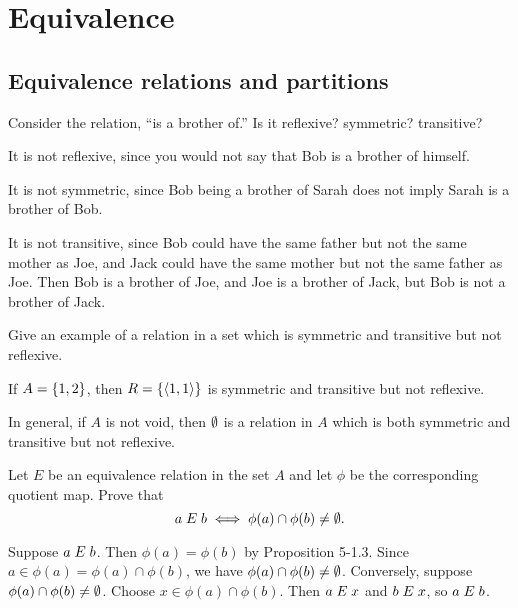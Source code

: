 \chapter{Equivalence}
\section{Equivalence relations and partitions}

\begin{exercise}
    Consider the relation, ``is a brother of.'' Is it reflexive? symmetric? transitive?
\end{exercise}

\begin{solution}
It is not reflexive, since you would not say that Bob is a brother of himself.

It is not symmetric, since Bob being a brother of Sarah does not imply Sarah is a brother of Bob.

It is not transitive, since Bob could have the same father but not the same mother as Joe,
and Jack could have the same mother but not the same father as Joe. Then Bob is a brother of Joe,
and Joe is a brother of Jack, but Bob is not a brother of Jack.
\end{solution}

\begin{exercise}
Give an example of a relation in a set which is symmetric and transitive but not
reflexive.
\end{exercise}

\begin{solution}
If $A=\left\{1,2\right\}$, then $R=\left\{\left\langle1,1\right\rangle\right\}$ is symmetric and transitive but not reflexive.

In general, if $A$ is not void, then $\emptyset$ is a relation in $A$ which is both
symmetric and transitive but not reflexive.
\end{solution}

\begin{exercise}
Let $E$ be an equivalence relation in the set $A$ and let $\phi$ be the corresponding quotient
map. Prove that
\[a\mathrel{E} b\iff \phi(a)\cap\phi(b)\neq\emptyset.\]
\end{exercise}

\begin{solution}
Suppose $a\mathrel{E} b$. Then $\phi(a)=\phi(b)$ by Proposition 5-1.3. Since $a\in\phi(a)=\phi(a)\cap\phi(b)$,
we have $\phi(a)\cap\phi(b)\neq\emptyset$.
Conversely, suppose $\phi(a)\cap\phi(b)\neq\emptyset$. Choose $x\in \phi(a)\cap\phi(b)$.
Then $a\mathrel{E} x$ and $b\mathrel{E} x$, so $a\mathrel{E} b$.
\end{solution}

